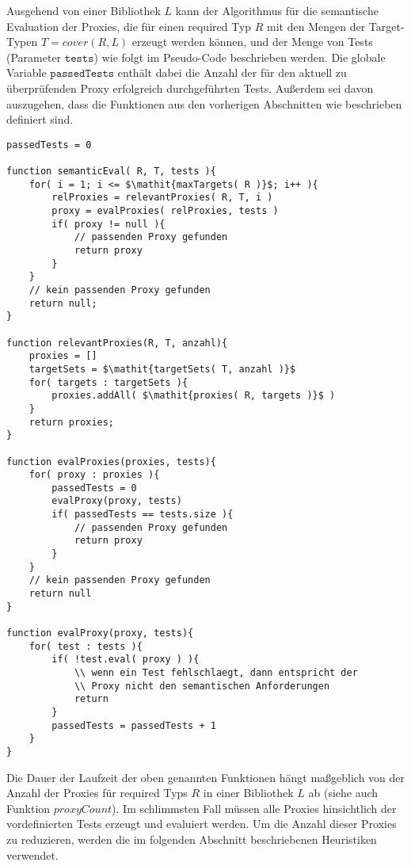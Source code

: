 \documentclass[a4paper,12pt]{article}
\begin{document}
\noindent
Ausgehend von einer Bibliothek $L$ kann der Algorithmus für die semantische Evaluation der Proxies, die für einen required Typ $R$ mit den Mengen der Target-Typen $T = \mathit{cover(R, L)}$ erzeugt werden können, und der Menge von Tests (Parameter $\texttt{tests}$) wie folgt im Pseudo-Code beschrieben werden. Die globale Variable $\texttt{passedTests}$ enthält dabei die Anzahl der für den aktuell zu überprüfenden Proxy erfolgreich durchgeführten Tests. Außerdem sei davon auszugehen, dass die Funktionen aus den vorherigen Abschnitten wie beschrieben definiert sind.
\begin{lstlisting}[style = pseudo, caption = Semantische Evaluation ohne Heuristiken, captionpos = b, label = lst_semEval]
passedTests = 0

function semanticEval( R, T, tests ){
	for( i = 1; i <= $\mathit{maxTargets( R )}$; i++ ){
		relProxies = relevantProxies( R, T, i )
		proxy = evalProxies( relProxies, tests )	
		if( proxy != null ){
			// passenden Proxy gefunden
			return proxy
		}
	}
	// kein passenden Proxy gefunden
	return null;
}

function relevantProxies(R, T, anzahl){
	proxies = []
	targetSets = $\mathit{targetSets( T, anzahl )}$
	for( targets : targetSets ){
		proxies.addAll( $\mathit{proxies( R, targets )}$ )
	}
	return proxies;
}

function evalProxies(proxies, tests){
	for( proxy : proxies ){
		passedTests = 0
		evalProxy(proxy, tests)
		if( passedTests == tests.size ){
			// passenden Proxy gefunden
			return proxy
		}
	}
	// kein passenden Proxy gefunden
	return null
}

function evalProxy(proxy, tests){
	for( test : tests ){
		if( !test.eval( proxy ) ){
			\\ wenn ein Test fehlschlaegt, dann entspricht der 
			\\ Proxy nicht den semantischen Anforderungen
			return
		}
		passedTests = passedTests + 1
	}
}
\end{lstlisting}
Die Dauer der Laufzeit der oben genannten Funktionen hängt maßgeblich von der Anzahl der Proxies für required Typs $R$ in einer Bibliothek $L$ ab (siehe auch Funktion $\mathit{proxyCount}$). Im schlimmsten Fall müssen alle Proxies hinsichtlich der vordefinierten Tests erzeugt und evaluiert werden. Um die Anzahl dieser Proxies zu reduzieren, werden die im folgenden Abschnitt beschriebenen Heuristiken verwendet.
\end{document}
